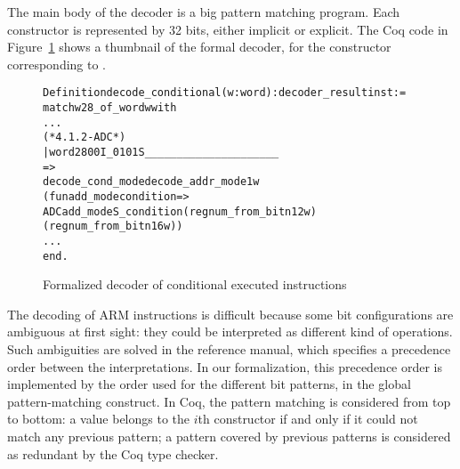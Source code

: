 
The main body of the decoder is a big pattern matching program. Each constructor
is represented by 32 bits, either implicit or explicit.
The Coq code in Figure~\ref{fig:coqdec} shows a thumbnail of the formal decoder,
for the constructor corresponding to \adc.

\begin{figure}[h]
\begin{alltt}
  Definition decode_conditional (w : word) : decoder_result inst :=
    match w28_of_word w with
    ...
      (*4.1.2 - ADC*)
      | word28 0 0 I_ 0 1 0 1 S_ _ _ _ _ _ _ _ _ _ _ _ _ _ _ _ _ _ _ _ _
      =>
        decode_cond_mode decode_addr_mode1 w
          (fun add_mode condition =>
            ADC add_mode S_ condition (regnum_from_bit n12 w)
                                      (regnum_from_bit n16 w))
    ...
    end.
\end{alltt}
\caption{Formalized decoder of conditional executed instructions}
\label{fig:coqdec}
\end{figure}

The decoding of ARM instructions is difficult because some bit
configurations are ambiguous at first sight: they could be interpreted
as different kind of operations.  Such ambiguities are solved in the
reference manual, which specifies a precedence order between the
interpretations.  In our formalization, this precedence order is
implemented by the order used for the different bit patterns, in the
global pattern-matching construct.
In Coq, the pattern matching is considered from
top to bottom: a value belongs to the $i$th constructor if and only if it
could not match any previous pattern;
a pattern covered by previous patterns is considered as redundant
by the Coq type checker.

